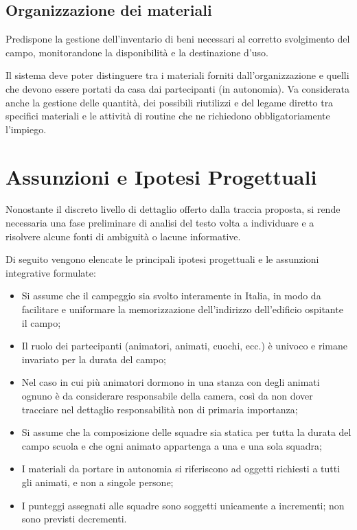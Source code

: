\documentclass[11pt,a4paper]{article}
\begin{document}
\subsection{Organizzazione dei materiali}

Predispone la gestione dell'inventario di beni necessari al corretto svolgimento del campo,
monitorandone la disponibilità e la destinazione d'uso.

Il sistema deve poter distinguere tra i materiali forniti dall'organizzazione e quelli che
devono essere portati da casa dai partecipanti (in autonomia). Va considerata anche la gestione
delle quantità, dei possibili riutilizzi e del legame diretto tra specifici materiali e le
attività di routine che ne richiedono obbligatoriamente l'impiego.


\section{Assunzioni e Ipotesi Progettuali}

Nonostante il discreto livello di dettaglio offerto dalla traccia proposta, si rende necessaria
una fase preliminare di analisi del testo volta a individuare e a risolvere alcune fonti di
ambiguità o lacune informative.

Di seguito vengono elencate le principali ipotesi progettuali e le assunzioni integrative
formulate:

\begin{itemize}[nosep]
  \item Si assume che il campeggio sia svolto interamente in Italia, in modo da facilitare e
    uniformare la memorizzazione dell'indirizzo dell'edificio ospitante il
    campo;
  \item Il ruolo dei partecipanti (animatori, animati, cuochi, ecc.) è univoco e rimane
    invariato per la durata del campo;
  \item Nel caso in cui più animatori dormono in una stanza con degli animati ognuno è da
    considerare responsabile della camera, così da non dover tracciare nel dettaglio
    responsabilità non di primaria importanza;
  \item Si assume che la composizione delle squadre sia statica per tutta la durata del campo
    scuola e che ogni animato appartenga a una e una sola squadra;
  \item I materiali da portare in autonomia si riferiscono ad oggetti richiesti a tutti gli
    animati, e non a singole persone;
  \item I punteggi assegnati alle squadre sono soggetti unicamente a incrementi; non sono
    previsti decrementi.
\end{itemize}
\end{document}
